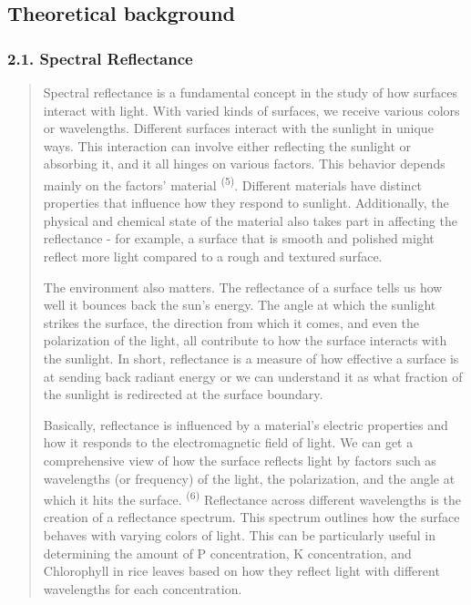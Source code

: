 \documentclass[
]{article}
\begin{document}
\hypertarget{theoretical-background}{%
\subsection{\texorpdfstring{\textbf{Theoretical background}
}{Theoretical background }}\label{theoretical-background}}

\hypertarget{spectral-reflectance}{%
\subsubsection{\texorpdfstring{\textbf{2.1. Spectral Reflectance}
}{2.1. Spectral Reflectance }}\label{spectral-reflectance}}

\begin{quote}
Spectral reflectance is a fundamental concept in the study of how
surfaces interact with light. With varied kinds of surfaces, we receive
various colors or wavelengths. Different surfaces interact with the
sunlight in unique ways. This interaction can involve either reflecting
the sunlight or absorbing it, and it all hinges on various factors. This
behavior depends mainly on the factors' material \textsuperscript{(5)}.
Different materials have distinct properties that influence how they
respond to sunlight. Additionally, the physical and chemical state of
the material also takes part in affecting the reflectance - for example,
a surface that is smooth and polished might reflect more light compared
to a rough and textured surface.

The environment also matters. The reflectance of a surface tells us how
well it bounces back the sun's energy. The angle at which the sunlight
strikes the surface, the direction from which it comes, and even the
polarization of the light, all contribute to how the surface interacts
with the sunlight. In short, reflectance is a measure of how effective a
surface is at sending back radiant energy or we can understand it as
what fraction of the sunlight is redirected at the surface boundary.

Basically, reflectance is influenced by a material's electric properties
and how it responds to the electromagnetic field of light. We can get a
comprehensive view of how the surface reflects light by factors such as
wavelengths (or frequency) of the light, the polarization, and the angle
at which it hits the surface. \textsuperscript{(6)} Reflectance across
different wavelengths is the creation of a reflectance spectrum. This
spectrum outlines how the surface behaves with varying colors of light.
This can be particularly useful in determining the amount of P
concentration, K concentration, and Chlorophyll in rice leaves based on
how they reflect light with different wavelengths for each
concentration.


\end{quote}
\end{document}
